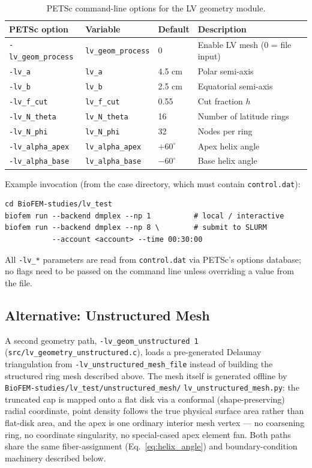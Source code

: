 \documentclass[11pt,a4paper]{article}
\begin{document}
\begin{table}[h]
\centering
\begin{tabular}{llll}
\toprule
PETSc option & Variable & Default & Description \\
\midrule
\texttt{-lv\_geom\_process} & \texttt{lv\_geom\_process} & 0        & Enable LV mesh (0 = file input) \\
\texttt{-lv\_a}             & \texttt{lv\_a}             & 4.5 cm   & Polar semi-axis \\
\texttt{-lv\_b}             & \texttt{lv\_b}             & 2.5 cm   & Equatorial semi-axis \\
\texttt{-lv\_f\_cut}        & \texttt{lv\_f\_cut}        & 0.55     & Cut fraction $h$ \\
\texttt{-lv\_N\_theta}      & \texttt{lv\_N\_theta}      & 16       & Number of latitude rings \\
\texttt{-lv\_N\_phi}        & \texttt{lv\_N\_phi}        & 32       & Nodes per ring \\
\texttt{-lv\_alpha\_apex}   & \texttt{lv\_alpha\_apex}   & $+60^\circ$ & Apex helix angle \\
\texttt{-lv\_alpha\_base}   & \texttt{lv\_alpha\_base}   & $-60^\circ$ & Base helix angle \\
\bottomrule
\end{tabular}
\caption{PETSc command-line options for the LV geometry module.}
\label{tab:options}
\end{table}

Example invocation (from the case directory, which must contain \texttt{control.dat}):
\begin{verbatim}
cd BioFEM-studies/lv_test
biofem run --backend dmplex --np 1          # local / interactive
biofem run --backend dmplex --np 8 \        # submit to SLURM
           --account <account> --time 00:30:00
\end{verbatim}
All \texttt{-lv\_*} parameters are read from \texttt{control.dat} via PETSc's options
database; no flags need to be passed on the command line unless overriding a
value from the file.

\subsection{Alternative: Unstructured Mesh}
A second geometry path, \texttt{-lv\_geom\_unstructured~1}
(\texttt{src/lv\_geometry\_unstructured.c}), loads a pre-generated Delaunay
triangulation from \texttt{-lv\_unstructured\_mesh\_file} instead of building
the structured ring mesh described above. The mesh itself is generated
offline by \texttt{BioFEM-studies/lv\_test/unstructured\_mesh/}\allowbreak
\texttt{lv\_unstructured\_mesh.py}: the truncated cap is mapped onto a flat
disk via a conformal (shape-preserving) radial coordinate, point density
follows the true physical surface area rather than flat-disk area, and the
apex is one ordinary interior mesh vertex — no coarsening ring, no
coordinate singularity, no special-cased apex element fan. Both paths share
the same fiber-assignment (Eq.~\eqref{eq:helix_angle}) and
boundary-condition machinery described below.
\end{document}

